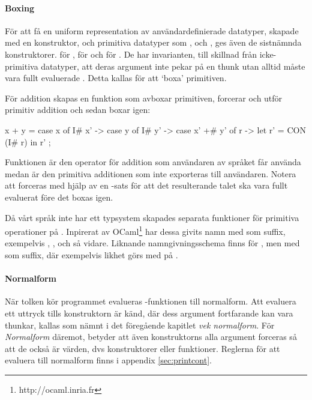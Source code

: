 \documentclass[../Core]{subfiles}
\begin{document}

\paragraph{Boxing}
\label{sec:boxing}

För att få en uniform representation av användardefinierade datatyper, skapade
med en konstruktor, och primitiva datatyper som ,  och , ges även 
de sistnämnda konstruktorer.  för ,  för  och 
 för . De har invarianten, till skillnad från icke-primitiva datatyper, 
att deras argument inte pekar på en thunk utan alltid måste vara fullt evaluerade  \cite{santos}. 
Detta kallas för att `boxa' primitiven.

    För addition skapas en funktion som avboxar primitiven,
forcerar och utför primitiv addition och sedan boxar igen:

\begin{codeEx}
x + y = case x of 
    { I# x' -> case y of
        { I# y' -> case x' +# y' of
            { r -> let r' = CON (I# r) 
                   in  r'
    }   }   };
\end{codeEx}

Funktionen \ic{+} är den operator för addition som användaren av språket
får använda medan \ic{+\#} är den primitiva additionen som inte exporteras till 
användaren. Notera att 
forceras med hjälp av en -sats för att det resulterande talet ska vara fullt
evaluerat före det boxas igen.

Då vårt språk inte har ett typsystem skapades separata funktioner för primitiva operationer
på . Inpirerat av OCaml\footnote{http://ocaml.inria.fr} har dessa
givits namn med  som suffix, exempelvis , ,  och så vidare.
Liknande namngivningsschema finns för , men med \ic{:} som suffix,
där exempelvis likhet görs med \ic{(==:)} på .

\paragraph{Normalform}
\label{sec:whnf}
\label{sec:nf}

När tolken kör programmet evalueras -funktionen till normalform.
Att evaluera ett uttryck tills konstruktorn är känd, där dess argument 
fortfarande kan vara thunkar, kallas som nämnt i det föregående kapitlet \emph{vek normalform}. 
För \emph{Normalform} däremot, betyder att även
konstruktorns alla argument forceras så att de också är värden, dvs konstruktorer eller funktioner.
Reglerna för att evaluera till normalform
finns i appendix \ref{sec:printcont}.
\end{document}
